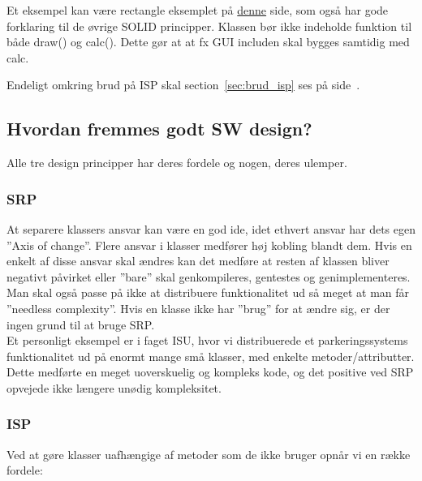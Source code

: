 Et eksempel kan være rectangle eksemplet på  \href{http://code.tutsplus.com/tutorials/solid-part-3-liskov-substitution-interface-segregation-principles--net-36710}{denne} side, som også har gode forklaring til de øvrige SOLID principper. Klassen bør ikke indeholde funktion til både draw() og calc(). Dette gør at at fx GUI includen skal bygges samtidig med calc.

Endeligt omkring brud på ISP skal section~\ref{sec:brud_isp} ses på side~\pageref{sec:brud_isp}.



\subsection{Hvordan fremmes godt SW design?}
Alle tre design principper har deres fordele og nogen, deres ulemper.

\subsubsection{SRP}
At separere klassers ansvar kan være en god ide, idet ethvert ansvar har dets egen ''Axis of change''. Flere ansvar i klasser medfører høj kobling blandt dem. Hvis en enkelt af disse ansvar skal ændres kan det medføre at resten af klassen bliver negativt påvirket eller ''bare'' skal genkompileres, gentestes og genimplementeres.\\

Man skal også passe på ikke at distribuere funktionalitet ud så meget at man får ”needless complexity”. Hvis en klasse ikke har ”brug” for at ændre sig, er der ingen grund til at bruge SRP.\\

Et personligt eksempel  er i faget ISU, hvor vi distribuerede et parkeringssystems funktionalitet ud på enormt mange små klasser, med enkelte metoder/attributter. Dette medførte en meget uoverskuelig og kompleks kode, og det positive ved SRP opvejede ikke længere unødig kompleksitet.

\subsubsection{ISP}
Ved at gøre klasser uafhængige af metoder som de ikke bruger opnår vi en række fordele:

